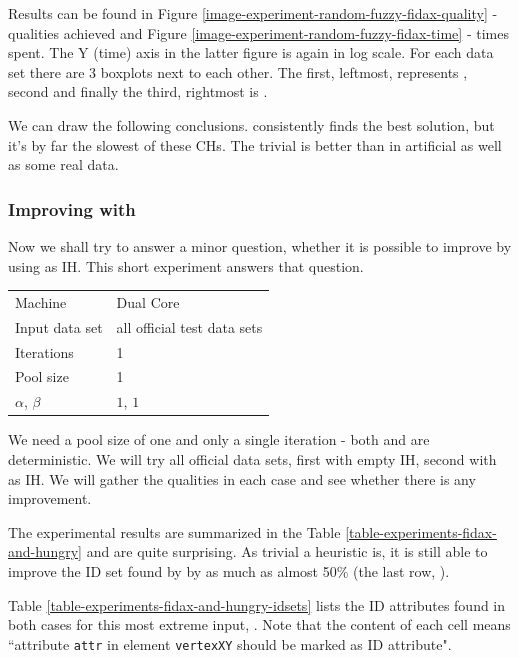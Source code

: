 Results can be found in Figure \ref{image-experiment-random-fuzzy-fidax-quality} - qualities achieved and Figure \ref{image-experiment-random-fuzzy-fidax-time} - times spent. The Y (time) axis in the latter figure is again in log scale. For each data set there are 3 boxplots next to each other. The first, leftmost, represents , second  and finally the third, rightmost is .

We can draw the following conclusions.  consistently finds the best solution, but it's by far the slowest of these CHs. The trivial  is better than  in artificial as well as some real data.

\subsubsection{Improving  with }


Now we shall try to answer a minor question, whether it is possible to improve  by using  as IH. This short experiment answers that question.

\begin{center}
\bigskip
\begin{tabular}{| l | l |}
  \hline
  \hline
  Machine           & Dual Core \\
  Input data set    & all official test data sets \\
  Iterations        & 1 \\
  Pool size         & 1 \\
  $\alpha$, $\beta$ & $1$, $1$ \\
  \hline
\end{tabular}
\bigskip
\end{center}

We need a pool size of one and only a single iteration - both  and  are deterministic. We will try all official data sets, first with empty IH, second with  as IH. We will gather the qualities in each case and see whether there is any improvement.

The experimental results are summarized in the Table \ref{table-experiments-fidax-and-hungry} and are quite surprising. As trivial a heuristic  is, it is still able to improve the ID set found by  by as much as almost 50\% (the last row, ).

Table \ref{table-experiments-fidax-and-hungry-idsets} lists the ID attributes found in both cases for this most extreme input, . Note that the content of each cell means ``attribute \texttt{attr} in element \texttt{vertexXY} should be marked as ID attribute".

